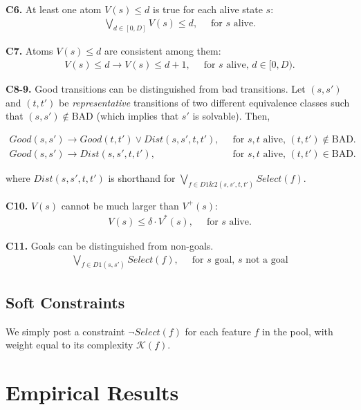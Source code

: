 \documentclass[a4paper]{article}
\newcommand{\smallpar}[1]{{\vspace{10pt}\noindent \bf #1.}}
\newcommand{\badtx}{\ensuremath{\mathrm{BAD}}}
\begin{document}
\smallpar{C6}
At least one atom $V(s) \leq d$ is true for each alive state $s$:
\begin{align}
 \bigvee_{d \in [0, D]} V(s) \leq d,&\;\; \text{for $s$ alive.}
\end{align}

\smallpar{C7}
Atoms $V(s) \leq d$ are consistent among them:
\begin{align}
 V(s) \leq d \rightarrow V(s) \leq d+1,&\;\; \text{for $s$ alive, $d \in [0, D)$.}
\end{align}

\smallpar{C8-9}
Good transitions can be distinguished from bad transitions.
Let $(s, s')$ and $(t, t')$ be \emph{representative} transitions
of two different equivalence classes such that $(s, s') \not\in \badtx$
(which implies that $s'$ is solvable). Then,

\begin{align}
 Good(s, s') \rightarrow Good(t, t') \lor
 Dist(s, s', t, t'),&\;\; \text{for $s, t$ alive, $(t, t') \not\in \badtx$.} \\
 Good(s, s') \rightarrow
 Dist(s, s', t, t'),&\;\; \text{for $s, t$ alive, $(t, t') \in \badtx$.}
\end{align}

\noindent where $Dist(s, s', t, t')$ is shorthand for $\bigvee_{f \in D1\&2(s, s', t, t')} Select(f)$.

\smallpar{C10}
$V(s)$ cannot be much larger than $V^+(s)$:
\begin{align}
 V(s) \leq \delta \cdot V^*(s),&\;\; \text{for $s$ alive.}
\end{align}


\smallpar{C11}
Goals can be distinguished from non-goals.
\begin{align}
\bigvee_{f \in D1(s, s')} Select(f),&\;\; \text{for $s$ goal, $s$ not a goal}
\end{align}


\subsection{Soft Constraints}
We simply post a constraint $\neg Select(f)$ for each feature $f$ in the pool, with weight equal to its complexity $\mathcal{K}(f)$.

\section{Empirical Results}





\end{document}
